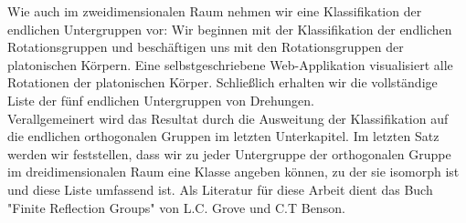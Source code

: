 Wie auch im zweidimensionalen Raum nehmen wir eine Klassifikation der endlichen Untergruppen vor: Wir beginnen mit der Klassifikation der endlichen Rotationsgruppen und beschäftigen uns mit den Rotationsgruppen der platonischen Körpern. Eine selbstgeschriebene Web-Applikation visualisiert alle Rotationen der platonischen Körper. Schließlich erhalten wir die vollständige Liste der fünf endlichen Untergruppen von Drehungen.\\
Verallgemeinert wird das Resultat durch die Ausweitung der Klassifikation auf die endlichen orthogonalen Gruppen im letzten Unterkapitel. Im letzten Satz werden wir feststellen, dass wir zu jeder Untergruppe der orthogonalen Gruppe im dreidimensionalen Raum eine Klasse angeben können, zu der sie isomorph ist und diese Liste umfassend ist.
Als Literatur für diese Arbeit dient das Buch "Finite Reflection Groups" von L.C. Grove und C.T Benson. 
